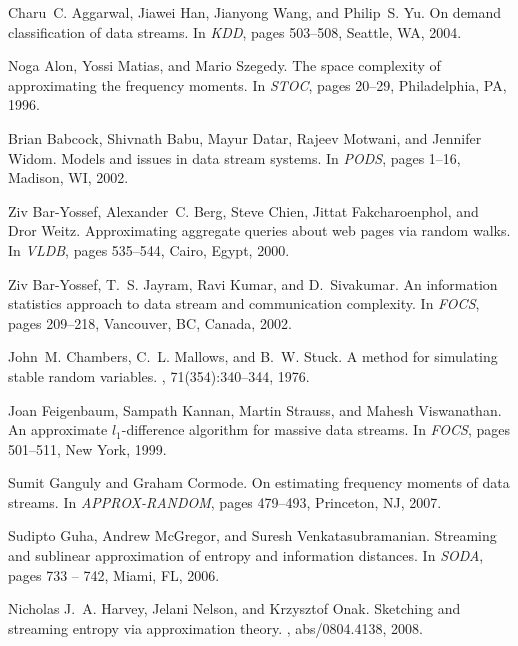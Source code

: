 \documentclass{sig-alternate}
\begin{document}
\begin{thebibliography}{10}

Charu~C. Aggarwal, Jiawei Han, Jianyong Wang, and Philip~S. Yu.
\newblock On demand classification of data streams.
\newblock In {\em KDD}, pages 503--508, Seattle, WA, 2004.

Noga Alon, Yossi Matias, and Mario Szegedy.
\newblock The space complexity of approximating the frequency moments.
\newblock In {\em STOC}, pages 20--29, Philadelphia, PA, 1996.

Brian Babcock, Shivnath Babu, Mayur Datar, Rajeev Motwani, and Jennifer Widom.
\newblock Models and issues in data stream systems.
\newblock In {\em PODS}, pages 1--16, Madison, WI, 2002.

Ziv Bar-Yossef, Alexander~C. Berg, Steve Chien, Jittat Fakcharoenphol, and Dror
  Weitz.
\newblock Approximating aggregate queries about web pages via random walks.
\newblock In {\em VLDB}, pages 535--544, Cairo, Egypt, 2000.

Ziv Bar-Yossef, T.~S. Jayram, Ravi Kumar, and D.~Sivakumar.
\newblock An information statistics approach to data stream and communication
  complexity.
\newblock In {\em FOCS}, pages 209--218, Vancouver, BC, Canada, 2002.

John~M. Chambers, C.~L. Mallows, and B.~W. Stuck.
\newblock A method for simulating stable random variables.
,
  71(354):340--344, 1976.

Joan Feigenbaum, Sampath Kannan, Martin Strauss, and Mahesh Viswanathan.
\newblock An approximate $l_1$-difference algorithm for massive data streams.
\newblock In {\em FOCS}, pages 501--511, New York, 1999.

Sumit Ganguly and Graham Cormode.
\newblock On estimating frequency moments of data streams.
\newblock In {\em APPROX-RANDOM}, pages 479--493, Princeton, NJ, 2007.

Sudipto Guha, Andrew McGregor, and Suresh Venkatasubramanian.
\newblock Streaming and sublinear approximation of entropy and information
  distances.
\newblock In {\em SODA}, pages 733 -- 742, Miami, FL, 2006.

Nicholas J.~A. Harvey, Jelani Nelson, and Krzysztof Onak.
\newblock Sketching and streaming entropy via approximation theory.
, abs/0804.4138, 2008.


\end{thebibliography}
\end{document}
